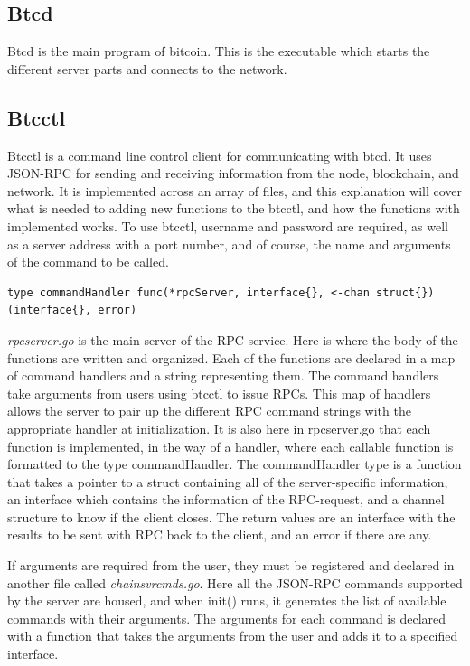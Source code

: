 \documentclass[12pt]{article}
\begin{document}
\subsection{Btcd}
Btcd is the main program of bitcoin. This is the executable which starts the different server parts and connects to the network. 

\subsection{Btcctl}
Btcctl is a command line control client for communicating with btcd. It uses JSON-RPC for sending and receiving information from the node, blockchain, and network. It is implemented across an array of files, and this explanation will cover what is needed to adding new functions to the btcctl, and how the functions with implemented works. To use btcctl, username and password are required, as well as a server address with a port number, and of course, the name and arguments of the command to be called. 
\begin{lstlisting}[float=h!,caption={Command handler type},label=lst:cmdHandler]
type commandHandler func(*rpcServer, interface{}, <-chan struct{}) (interface{}, error)
\end{lstlisting}

{\it{rpcserver.go}} is the main server of the RPC-service. Here is where the body of the functions are written and organized. Each of the functions are declared in a map of command handlers and a string representing them. The command handlers take arguments from users using btcctl to issue RPCs. This map of handlers allows the server to pair up the different RPC command strings with the appropriate handler at initialization. It is also here in rpcserver.go that each function is implemented, in the way of a handler, where each callable function is formatted to the type commandHandler. The commandHandler type is a function that takes a pointer to a struct containing all of the server-specific information, an interface which contains the information of the RPC-request, and a channel structure to know if the client closes. The return values are an interface with the results to be sent with RPC back to the client, and an error if there are any.

If arguments are required from the user, they must be registered and declared in another file called {\it{chainsvrcmds.go}}. Here all the JSON-RPC commands supported by the server are housed, and when init() runs, it generates the list of available commands with their arguments. The arguments for each command is declared with a function that takes the arguments from the user and adds it to a specified interface. 
\end{document}
